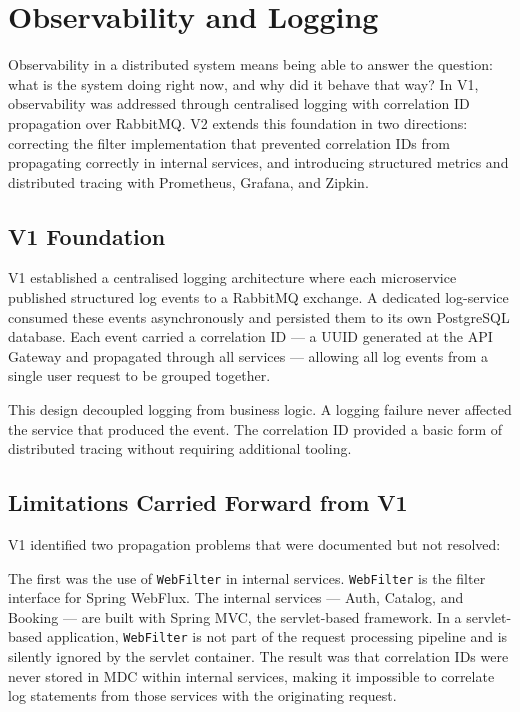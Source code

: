 \section{Observability and Logging}

Observability in a distributed system means being able to answer the question: what is the system doing right now, and why did it behave that way? In V1, observability was addressed through centralised logging with correlation ID propagation over RabbitMQ. V2 extends this foundation in two directions: correcting the filter implementation that prevented correlation IDs from propagating correctly in internal services, and introducing structured metrics and distributed tracing with Prometheus, Grafana, and Zipkin.

\subsection{V1 Foundation}

V1 established a centralised logging architecture where each microservice published structured log events to a RabbitMQ exchange. A dedicated log-service consumed these events asynchronously and persisted them to its own PostgreSQL database. Each event carried a correlation ID --- a UUID generated at the API Gateway and propagated through all services --- allowing all log events from a single user request to be grouped together.

This design decoupled logging from business logic. A logging failure never affected the service that produced the event. The correlation ID provided a basic form of distributed tracing without requiring additional tooling.

\subsection{Limitations Carried Forward from V1}

V1 identified two propagation problems that were documented but not resolved:

The first was the use of \texttt{WebFilter} in internal services. \texttt{WebFilter} is the filter interface for Spring WebFlux. The internal services --- Auth, Catalog, and Booking --- are built with Spring MVC, the servlet-based framework. In a servlet-based application, \texttt{WebFilter} is not part of the request processing pipeline and is silently ignored by the servlet container. The result was that correlation IDs were never stored in MDC within internal services, making it impossible to correlate log statements from those services with the originating request.

